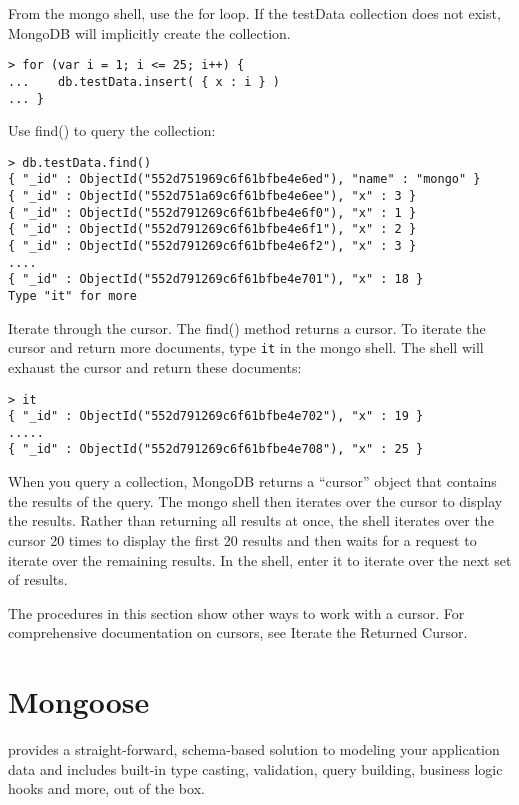 
From the mongo shell, use the for loop. If the testData collection does not exist, MongoDB will implicitly create the collection.
\begin{verbatim}
> for (var i = 1; i <= 25; i++) {
...    db.testData.insert( { x : i } )
... }
\end{verbatim}
Use find() to query the collection:
\begin{verbatim}
> db.testData.find()
{ "_id" : ObjectId("552d751969c6f61bfbe4e6ed"), "name" : "mongo" }
{ "_id" : ObjectId("552d751a69c6f61bfbe4e6ee"), "x" : 3 }
{ "_id" : ObjectId("552d791269c6f61bfbe4e6f0"), "x" : 1 }
{ "_id" : ObjectId("552d791269c6f61bfbe4e6f1"), "x" : 2 }
{ "_id" : ObjectId("552d791269c6f61bfbe4e6f2"), "x" : 3 }
....
{ "_id" : ObjectId("552d791269c6f61bfbe4e701"), "x" : 18 }
Type "it" for more
\end{verbatim}
Iterate through the cursor.
The find() method returns a cursor. To iterate the cursor and return more documents, type 
\verb|it| in the mongo shell. The shell will exhaust the cursor and return these documents:
\begin{verbatim}
> it
{ "_id" : ObjectId("552d791269c6f61bfbe4e702"), "x" : 19 }
.....
{ "_id" : ObjectId("552d791269c6f61bfbe4e708"), "x" : 25 }
\end{verbatim}


When you query a collection, MongoDB returns a “cursor” object that
contains the results of the query. The mongo shell then iterates over
the cursor to display the results. Rather than returning all results at
once, the shell iterates over the cursor 20 times to display the first
20 results and then waits for a request to iterate over the remaining
results. In the shell, enter it to iterate over the next set of results.

The procedures in this section show other ways to work with a cursor. For comprehensive documentation on cursors, see Iterate the Returned Cursor.

\section{Mongoose}

provides a straight-forward, schema-based solution to modeling your
application data and includes built-in type casting, validation, query
building, business logic hooks and more, out of the box.

